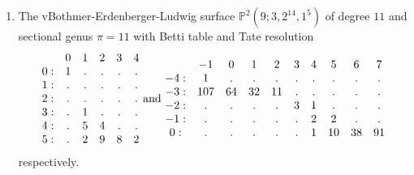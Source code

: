 \documentclass[twoside,12pt, leqno]{amsart}
\def\PP{{\mathbb P}}
\begin{document}
\begin{enumerate}
\item The vBothmer-Erdenberger-Ludwig surface $\PP^{2}(9;3,2^{14},1^{5})$ of degree $11$ and sectional genus $\pi=11$ with Betti table and Tate resolution
$$\begin{matrix}
       & 0 & 1 & 2 & 3 & 4\\
      0: & 1 & . & . & . & .\\
      1: & . & . & . & . & .\\
      2: & . & . & . & . & .\\
      3: & . & 1 & . & . & .\\
      4: & . & 5 & 4 & . & .\\
      5: & . & 2 & 9 & 8 & 2
      \end{matrix}
\hbox{ and  } 
\begin{matrix}
        & -1 & 0 & 1 & 2 & 3 & 4 & 5 & 6 & 7\\
       -4: & 1 & . & . & . & . & . & . & . & .\\
       -3: & 107 & 64 & 32 & 11 & . & . & . & . & .\\
       -2: & . & . & . & . & 3 & 1 & . & . & .\\
       -1: & . & . & . & . & . & 2 & 2 & . & .\\
       0: & . & . & . & . & . & 1 & 10 & 38 & 91
       \end{matrix}
$$
respectively.


\end{enumerate}
\end{document}
